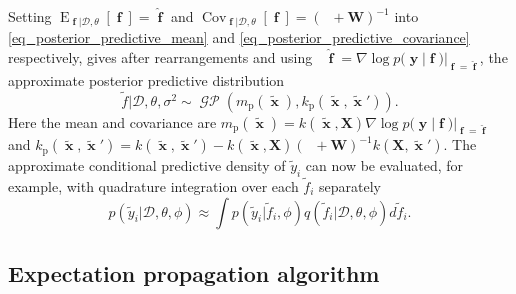 \documentclass[twoside,11pt]{article}
\DeclareMathOperator{\Kff}{\mathbf{K}_{f,f}}
\DeclareMathOperator{\iKff}{\mathbf{K}_{f,f}^{-1}}
\DeclareMathOperator{\x}{\mathbf{x}}
\DeclareMathOperator{\f}{\mathbf{f}}
\DeclareMathOperator{\y}{\mathbf{y}}
\DeclareMathOperator{\GP}{\mathcal{GP}}
\newcommand{\mb}{\mathbf}
\DeclareMathOperator{\E}{E}
\DeclareMathOperator{\COV}{Cov}
\begin{document}
Setting $\E_{\f|\mathcal{D},\theta}[\f] = \hat{\f}$ and
$\COV_{\f|\mathcal{D},\theta}[\f] = (\iKff + \mb{W})^{-1}$ into
\eqref{eq_posterior_predictive_mean} and
\eqref{eq_posterior_predictive_covariance} respectively, gives after
rearrangements and using $\iKff\hat{\f} = \nabla\log
p(\y|\f)|_{\f=\hat{\f}}$, the approximate posterior predictive
distribution
%
\begin{equation}\label{eq_posterior_in_Laplace_case}
\tilde{f}|\mathcal{D},\theta, \sigma^2 \sim \GP\left(m_{\text{p}}(\tilde{\x}), k_{\text{p}}(\tilde{\x},\tilde{\x}')\right).
\end{equation}
%
Here the mean and covariance are $m_{\text{p}}(\tilde{\x}) = k(\tilde{\x},\mb{X})\nabla\log
p(\y|\f)|_{\f=\hat{\f}}$ and 
$k_{\text{p}}(\tilde{\x},\tilde{\x}')=k(\tilde{\x},\tilde{\x}') - k(\tilde{\x},\mb{X})(\Kff +
\mb{W})^{-1}k(\mb{X},\tilde{\x}')$.
%
The approximate conditional predictive density of $\tilde{y}_i$ can
now be evaluated, for example, with quadrature integration over each
$\tilde{f}_i$ separately
%
\begin{equation}
p(\tilde{y}_i|\mathcal{D}, \theta, \phi) \approx \int
p(\tilde{y}_i|\tilde{f}_i,\phi)q(\tilde{f}_i|\mathcal{D}, \theta,
\phi) d \tilde{f}_i. 
\end{equation}
%    
\subsection{Expectation propagation algorithm}
\end{document}
